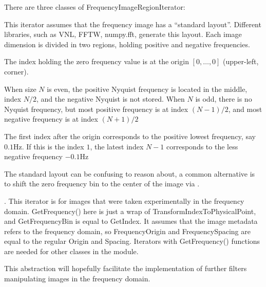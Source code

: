 There are three classes of FrequencyImageRegionIterator:
\begin{description}[topsep=0pt,font=\normalfont\textbullet\space]
  \item [FFTLayout:] \newline
    This iterator assumes that the frequency image has a ``standard layout''. Different libraries, such as VNL, FFTW, numpy.fft, generate this layout. Each image dimension is divided in two regions, holding positive and negative frequencies.
    \begin{description}[topsep=0pt,font=\normalfont-\space]
      \item[ZeroFrequency:] The index holding the zero frequency value is at the origin $[0,\ldots,0]$ (upper-left, corner).
      \item[Nyquist:] When size $N$ is even, the positive Nyquist frequency is located in the middle, index $N/2$, and the negative Nyquist is not stored.
    When $N$ is odd, there is no Nyquist frequency, but most positive frequency is at index $(N-1)/2$, and most negative frequency is at index $(N+1)/2$
    \end{description}
    The first index after the origin corresponds to the positive lowest frequency, say $0.1 \text{Hz}$. If this is the index $1$, the latest index $N-1$ corresponds to the less negative frequency $-0.1 \text{Hz}$

  \item [ShiftedFFTLayout:] \newline
    The standard layout can be confusing to reason about, a common alternative is to shift the zero frequency bin to the center of the image via .
  \item [Regular:] .\newline
    This iterator is for images that were taken experimentally in the frequency domain. GetFrequency() here is just a wrap of TransformIndexToPhysicalPoint, and GetFrequencyBin is equal to GetIndex. It assumes that the image metadata refers to the frequency domain, so FrequencyOrigin and FrequencySpacing are equal to the regular Origin and Spacing.
    Iterators with GetFrequency() functions are needed for other classes in the module.
\end{description}

This abstraction will hopefully facilitate the implementation of further filters manipulating images in the frequency domain.

